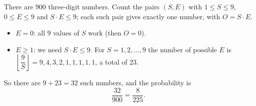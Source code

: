 There are $900$ three-digit numbers. Count the pairs $(S,E)$ with $1\le S\le9$, $0\le E\le9$ and $S\cdot E\le9$; each such pair gives exactly one number, with $O=S\cdot E$.
\begin{itemize}
\item $E=0$: all $9$ values of $S$ work (then $O=0$).
\item $E\ge1$: we need $S\cdot E\le9$. For $S=1,2,\dots,9$ the number of possible $E$ is $\left\lfloor\dfrac{9}{S}\right\rfloor=9,4,3,2,1,1,1,1,1$, a total of $23$.
\end{itemize}
So there are $9+23=32$ such numbers, and the probability is
\[\dfrac{32}{900}=\boxed{\dfrac{8}{225}}.\]
